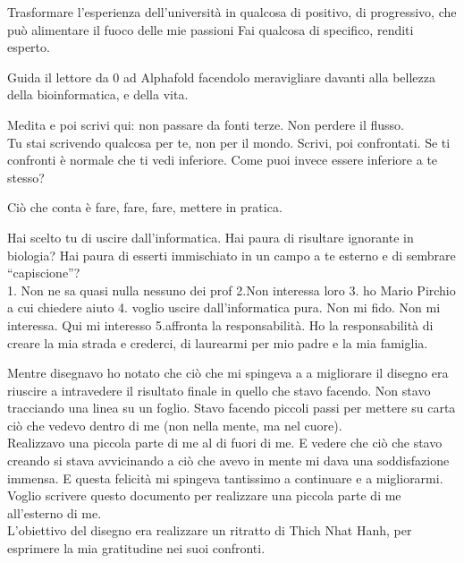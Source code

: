 Trasformare l’esperienza dell’università in qualcosa di positivo, di progressivo, che può alimentare il fuoco delle mie passioni
Fai qualcosa di specifico, renditi esperto.\newline

Guida il lettore da 0 ad Alphafold facendolo meravigliare davanti alla bellezza della bioinformatica, e della vita.\newline

Medita e poi scrivi qui: non passare da fonti terze. Non perdere il flusso.\\
Tu stai scrivendo qualcosa per te, non per il mondo. Scrivi, poi confrontati. Se ti confronti è normale che ti vedi inferiore. Come puoi invece essere inferiore a te stesso? \newline

Ciò che conta è fare, fare, fare, mettere in pratica.\newline

Hai scelto tu di uscire dall’informatica. Hai paura di risultare ignorante in biologia? Hai paura di esserti immischiato in un campo a te esterno e di sembrare “capiscione”? \\
1. Non ne sa quasi nulla nessuno dei prof 2.Non interessa loro 3. ho Mario Pirchio a cui chiedere aiuto 4. voglio uscire dall’informatica pura. Non mi fido. Non mi interessa. Qui mi interesso 5.affronta la responsabilità. Ho la responsabilità di creare la mia strada e crederci, di laurearmi per mio padre e la mia famiglia.\newline

Mentre disegnavo ho notato che ciò che mi spingeva a a migliorare il disegno era riuscire a intravedere il risultato finale in quello che stavo facendo. Non stavo tracciando una linea su un foglio. Stavo facendo piccoli passi per mettere su carta ciò che vedevo dentro di me (non nella mente, ma nel cuore).\\ Realizzavo una piccola parte di me al di fuori di me. E vedere che ciò che stavo creando si stava avvicinando a ciò che avevo in mente mi dava una soddisfazione immensa. E questa felicità mi spingeva tantissimo a continuare e a migliorarmi.\\
Voglio scrivere questo documento per realizzare una piccola parte di me all’esterno di me.\\
L’obiettivo del disegno era realizzare un ritratto di Thich Nhat Hanh, per esprimere la mia gratitudine nei suoi confronti.\newline

